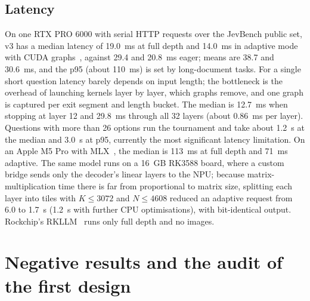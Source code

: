 \documentclass[10pt]{article}
\begin{document}
\subsection{Latency}

On one RTX PRO 6000 with serial HTTP requests over the JevBench public set, v3 has a median latency of 19.0~ms at full depth and 14.0~ms in adaptive mode with CUDA graphs~\cite{cudagraphs}, against 29.4 and 20.8~ms eager; means are 38.7 and 30.6~ms, and the p95 (about 110~ms) is set by long-document tasks.
For a single short question latency barely depends on input length; the bottleneck is the overhead of launching kernels layer by layer, which graphs remove, and one graph is captured per exit segment and length bucket.
The median is 12.7~ms when stopping at layer 12 and 29.8~ms through all 32 layers (about 0.86~ms per layer).
Questions with more than 26 options run the tournament and take about 1.2~s at the median and 3.0~s at p95, currently the most significant latency limitation.
On an Apple M5 Pro with MLX~\cite{mlx}, the median is 113~ms at full depth and 71~ms adaptive.
The same model runs on a 16~GB RK3588 board, where a custom bridge sends only the decoder's linear layers to the NPU; because matrix-multiplication time there is far from proportional to matrix size, splitting each layer into tiles with $K\le 3072$ and $N\le 4608$ reduced an adaptive request from 6.0 to 1.7~s (1.2~s with further CPU optimisations), with bit-identical output.
Rockchip's RKLLM~\cite{rknn} runs only full depth and no images.

\section{Negative results and the audit of the first design}
\label{sec:neg}
\end{document}
